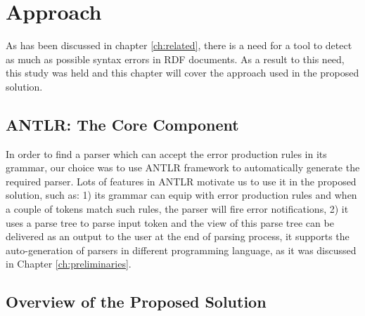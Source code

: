 \chapter{Approach}
\label{ch:approach}
As has been discussed in chapter \ref{ch:related}, there is a need for a tool to detect as much as possible syntax errors in RDF documents. As a result to this need, this study was held and this chapter will cover the approach used in the proposed solution.

\section{ANTLR: The Core Component}
In order to find a parser which can accept the error production rules in its grammar, our choice was to use ANTLR framework to automatically generate the required parser. Lots of features in ANTLR motivate us to use it in the proposed solution, such as: 1) its grammar can equip with error production rules and when a couple of tokens match such rules, the parser will fire  error notifications, 2) it uses a parse tree to parse input token and the view of this parse tree can be delivered as an output to the user at the end of parsing process, it supports the auto-generation of parsers in different programming language, as it was discussed in Chapter \ref{ch:preliminaries}.
\section{Overview of the Proposed Solution}

